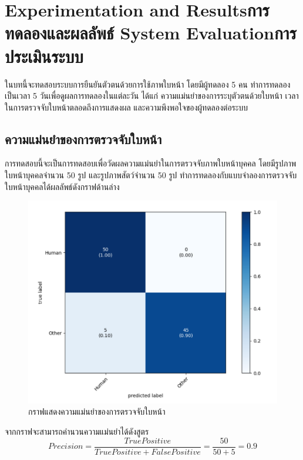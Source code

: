 \chapter{\ifproject%
\ifenglish Experimentation and Results\else การทดลองและผลลัพธ์\fi
\else%
\ifenglish System Evaluation\else การประเมินระบบ\fi
\fi}

ในบทนี้จะทดสอบระบบการยืนยันตัวตนด้วยการใช้ภาพใบหน้า โดยมีผู้ทดลอง 5 คน 
ทำการทดลองเป็นเวลา 5 วันเพื่อดูผลการทดลองในแต่ละวัน ได้แก่ ความแม่นยำของการระบุตัวตนด้วยใบหน้า 
เวลาในการตรวจจับใบหน้าตลอดถึงการแสดงผล และความพึงพอใจของผู้ทดลองต่อระบบ

\section{ความแม่นยำของการตรวจจับใบหน้า}
การทดสอบนี้จะเป็นการทดสอบเพื่อวัดผลความแม่นยำในการตรวจจับภาพใบหน้าบุคคล โดยมีรูปภาพใบหน้าบุคคลจำนวน 50 รูป และรูปภาพสัตว์จำนวน 50 รูป 
ทำการทดลองกับแบบจำลองการตรวจจับใบหน้าบุคคลได้ผลลัพธ์ดังกราฟด้านล่าง

\begin{figure}[!ht]
  \begin{center}
    \includegraphics[scale=.45]{pic/face_result.png}
    \caption[กราฟแสดงความแม่นยำของการตรวจจับใบหน้า]{กราฟแสดงความแม่นยำของการตรวจจับใบหน้า}
    \label{fig:acc_graph}
  \end{center}
\end{figure}

\indent จากกราฟจะสามารถคำนวนความแม่นยำได้ดังสูตร 
\begin{equation}\label{eq:dielectric}
Precision=\frac{True Positive}{True Positive + False Positive}=\frac{50}{50+5} = 0.9
\end{equation}


